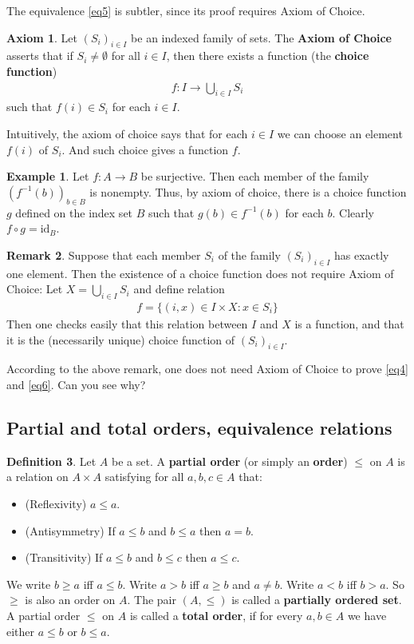 \documentclass[12pt,b5paper,notitlepage]{article}
\theoremstyle{definition}
\newtheorem{df}{Definition}[section]
\newtheorem{eg}[df]{Example}
\newtheorem{rem}[df]{Remark}
\newtheorem*{axiom}{Axiom}
\theoremstyle{plain}
\newcommand{\id}{\mathrm{id}}
\numberwithin{equation}{section}
\begin{document}
The equivalence \eqref{eq5} is subtler, since its proof requires Axiom of Choice.


\begin{axiom}
Let $(S_i)_{i\in I}$ be an indexed family of sets. The \textbf{Axiom of Choice} asserts that if $S_i\neq\emptyset$ for all $i\in I$, then there exists a function (the \textbf{choice function})
\begin{align*}
f:I\rightarrow \bigcup_{i\in I}S_i
\end{align*}
such that $f(i)\in S_i$ for each $i\in I$.
\end{axiom}


Intuitively, the axiom of choice says that for each $i\in I$ we can choose an element $f(i)$ of $S_i$. And such choice gives a function $f$.


\begin{eg}
Let $f:A\rightarrow B$ be surjective. Then each member of the family $(f^{-1}(b))_{b\in B}$ is nonempty. Thus, by axiom of choice, there is a choice function $g$ defined on the index set $B$ such that $g(b)\in f^{-1}(b)$ for each $b$. Clearly $f\circ g=\id_B$.
\end{eg}



\begin{rem}
Suppose that each member $S_i$ of the family $(S_i)_{i\in I}$ has exactly one element. Then the existence of a choice function does not require Axiom of Choice: Let $X=\bigcup_{i\in I}S_i$ and define relation
\begin{align*}
f=\{(i,x)\in I\times X: x\in S_i\}
\end{align*}
Then one checks easily that this relation between $I$ and $X$ is a function, and that it is the (necessarily unique) choice function of $(S_i)_{i\in I}$.
\end{rem}

According to the above remark, one does not need Axiom of Choice to prove \eqref{eq4} and \eqref{eq6}. Can you see why?


\subsection{Partial and total orders, equivalence relations}

\begin{df}
Let $A$ be a set. A \textbf{partial order} (or simply an \textbf{order}) $\leq$ on $A$ is a relation on $A\times A$ satisfying for all $a,b,c\in A$ that:
\begin{itemize}
\item (Reflexivity) $a\leq a$.
\item (Antisymmetry) If $a\leq b$ and $b\leq a$ then $a=b$.
\item (Transitivity) If $a\leq b$ and $b\leq c$ then $a\leq c$.
\end{itemize}
We write $b\geq a$ iff $a\leq b$. Write $a>b$ iff $a\geq b$ and $a\neq b$. Write $a<b$ iff $b>a$. So $\geq$ is also an order on $A$. The pair $(A,\leq)$ is called a \textbf{partially ordered set}. A partial order $\leq$ on $A$ is called a \textbf{total order}, if for every $a,b\in A$ we have either $a\leq b$ or $b\leq a$.
\end{df}
\end{document}

